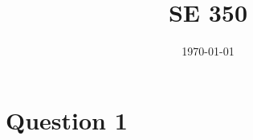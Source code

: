 \documentclass[11pt]{article}
\title{SE 350}
\date{\today}
\begin{document}
\maketitle

\section{Question 1}
\end{document}
